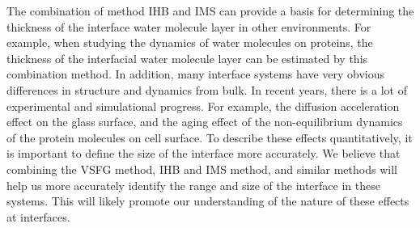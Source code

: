 The combination of method IHB and IMS can provide a basis for determining the thickness of the interface water molecule layer in other environments. 
For example, when studying the dynamics of water molecules on proteins, the thickness of the interfacial water molecule layer can be estimated by this combination method.
In addition, many interface systems have very obvious differences in structure and dynamics from bulk.
In recent years, there is a lot of experimental and simulational progress. For example, the diffusion acceleration effect on the glass surface\cite{ZhuL11,ZhangWei16}, 
and the aging effect of the non-equilibrium dynamics of the protein molecules on cell surface\cite{HuXiaohu16}. 
To describe these effects quantitatively, it is important to define the size of the interface more accurately. 
We believe that combining the VSFG method, IHB and IMS method, and similar methods will help us more accurately identify the range and size of the interface in these systems.
This will likely promote our understanding of the nature of these effects at interfaces.




